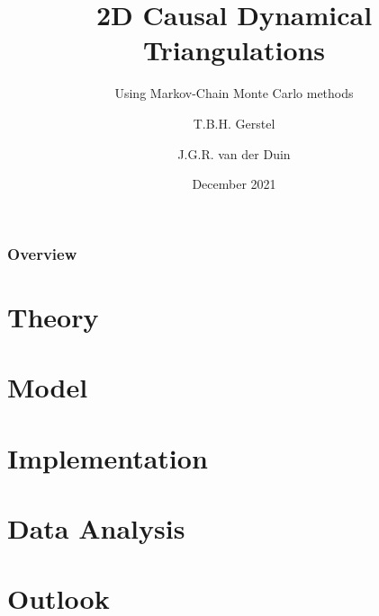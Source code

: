 \documentclass{beamer}
\title{2D Causal Dynamical Triangulations}
\subtitle{Using Markov-Chain Monte Carlo methods}
\author{T.B.H. Gerstel \and J.G.R. van der Duin}
\date{December 2021}
\institute{Radboud University Nijmegen}
\begin{document}
\frame{\titlepage}

\begin{frame}
    \frametitle{Overview}
    \tableofcontents
\end{frame}

\section{Theory}



\section{Model}


\section{Implementation} %


\section{Data Analysis}


\section{Outlook}

\end{document}
